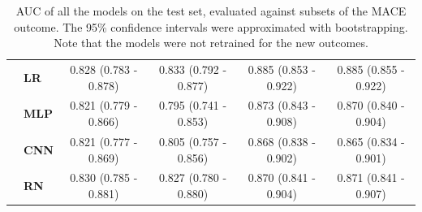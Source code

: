 \documentclass[preprint]{elsarticle}
\begin{document}
\begin{table}[H]
\begin{adjustbox}{center}
\begin{tabular}{@{}llcccc@{}}
& \textbf{LR} & 0.828 (0.783 - 0.878) & 0.833 (0.792 - 0.877) & 0.885 (0.853 - 0.922) & 0.885 (0.855 - 0.922) \\
& \textbf{MLP} & 0.821 (0.779 - 0.866) & 0.795 (0.741 - 0.853) & 0.873 (0.843 - 0.908) & 0.870 (0.840 - 0.904) \\
& \textbf{CNN} & 0.821 (0.777 - 0.869) & 0.805 (0.757 - 0.856) & 0.868 (0.838 - 0.902) & 0.865 (0.834 - 0.901) \\
& \textbf{RN} & 0.830 (0.785 - 0.881) & 0.827 (0.780 - 0.880) & 0.870 (0.841 - 0.904) & 0.871 (0.841 - 0.907) \\

\bottomrule
\end{tabular}
\end{adjustbox}
\caption{AUC of all the models on the test set, evaluated against subsets of the MACE outcome. The 95\% confidence intervals were approximated with bootstrapping. Note that the models were not retrained for the new outcomes.}
\label{table:appendix:outcomes}
\end{table}
\renewcommand{\arraystretch}{1}
\end{document}
